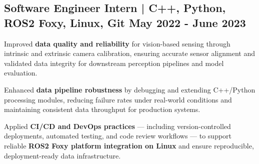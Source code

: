 \subsection{{Software Engineer Intern | C++, Python, ROS2 Foxy, Linux, Git \hfill May 2022 - June 2023}}
\begin{zitemize}
    \item Improved \textbf{data quality and reliability} for vision-based sensing through intrinsic and extrinsic camera calibration, ensuring accurate sensor alignment and validated data integrity for downstream perception pipelines and model evaluation.

    \item Enhanced \textbf{data pipeline robustness} by debugging and extending C++/Python processing modules, reducing failure rates under real-world conditions and maintaining consistent data throughput for production systems.

    \item Applied \textbf{CI/CD and DevOps practices} — including version-controlled deployments, automated testing, and code review workflows — to support reliable \textbf{ROS2 Foxy platform integration on Linux} and ensure reproducible, deployment-ready data infrastructure.
\end{zitemize}






